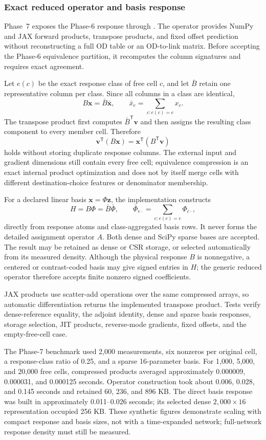\subsubsection{Exact reduced operator and basis response}
\label{sec:reduced-od-response-operator}

Phase~7 exposes the Phase-6 response through
.  The
operator provides NumPy and JAX forward products, transpose products, and fixed
offset prediction without reconstructing a full OD table or an OD-to-link
matrix.  Before accepting the Phase-6 equivalence partition, it recomputes the
column signatures and requires exact agreement.

Let $e(c)$ be the exact response class of free cell $c$, and let $\bar B$ retain
one representative column per class.  Since all columns in a class are
identical,
\[
B\bm x
=\bar B\bar{\bm x},
\qquad
\bar x_e=\sum_{c:e(c)=e}x_c.
\]
The transpose product first computes $\bar B^{\mathsf T}\bm v$ and then assigns
the resulting class component to every member cell.  Therefore
\[
\bm v^{\mathsf T}(B\bm x)
=\bm x^{\mathsf T}(B^{\mathsf T}\bm v)
\]
holds without storing duplicate response columns.  The external input and
gradient dimensions still contain every free cell; equivalence compression is
an exact internal product optimization and does not by itself merge cells with
different destination-choice features or denominator membership.

For a declared linear basis $\bm x=\Phi\bm z$, the implementation constructs
\[
H=B\Phi
=\bar B\bar\Phi,
\qquad
\bar\Phi_{e\cdot}
=\sum_{c:e(c)=e}\Phi_{c\cdot},
\]
directly from response atoms and class-aggregated basis rows.  It never forms
the detailed assignment operator $A$.  Both dense and SciPy sparse bases are
accepted.  The result may be retained as dense or CSR storage, or selected
automatically from its measured density.  Although the physical response $B$
is nonnegative, a centered or contrast-coded basis may give signed entries in
$H$; the generic reduced operator therefore accepts finite nonzero signed
coefficients.

JAX products use scatter-add operations over the same compressed arrays, so
automatic differentiation returns the implemented transpose product.  Tests
verify dense-reference equality, the adjoint identity, dense and sparse basis
responses, storage selection, JIT products, reverse-mode gradients, fixed
offsets, and the empty-free-cell case.

The Phase-7 benchmark used 2,000 measurements, six nonzeros per original cell,
a response-class ratio of 0.25, and a sparse 16-parameter basis.  For 1,000,
5,000, and 20,000 free cells, compressed products averaged approximately
0.000009, 0.000031, and 0.000125 seconds.  Operator construction took about
0.006, 0.028, and 0.145 seconds and retained 60, 236, and 896 KB.  The direct
basis response was built in approximately 0.011--0.026 seconds; its selected
dense $2{,}000\times16$ representation occupied 256 KB.  These synthetic
figures demonstrate scaling with compact response and basis sizes, not with a
time-expanded network; full-network response density must still be measured.

